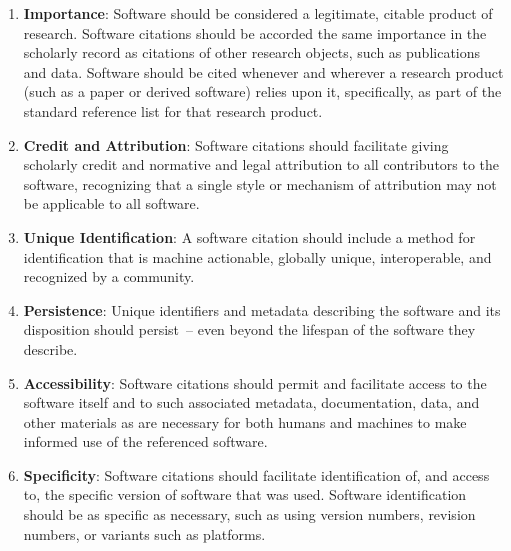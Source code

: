 \documentclass[11pt, oneside]{amsart}
\begin{document}
\begin{enumerate}
\item \textbf{Importance}: \label{principle:importance}
Software should be considered a legitimate, citable product of research. Software citations should be accorded the same importance in the scholarly record as citations of other research objects, such as publications and data. Software should be cited whenever and wherever a research product (such as a paper or derived software) relies upon it, specifically, as part of the standard reference list for that research product.
\item \textbf{Credit and Attribution}: \label{principle:credit}
Software citations should facilitate giving scholarly credit and normative
and legal attribution to all contributors to the software, recognizing
that a single style or mechanism of attribution may not be applicable to
all software.
\item \textbf{Unique Identification}: \label{principle:uid}
A software citation should include a method for identification that is
machine actionable, globally unique, interoperable, and recognized by
a community.
\item \textbf{Persistence}: \label{principle:persistence}
Unique identifiers and metadata describing the software and its disposition should persist~-- even beyond the lifespan of the software they describe.
\item \textbf{Accessibility}: \label{principle:accessibility}
Software citations should permit and facilitate access to the software itself and to such associated metadata, documentation, data, and other materials as are necessary for both humans and machines to make informed use of the referenced software.
\item \textbf{Specificity}:
Software citations should facilitate identification of, and access to, the specific version of software that was used.  Software identification should be as specific as necessary, such as using version numbers, revision numbers, or variants such as platforms.
\end{enumerate}
\end{document}
